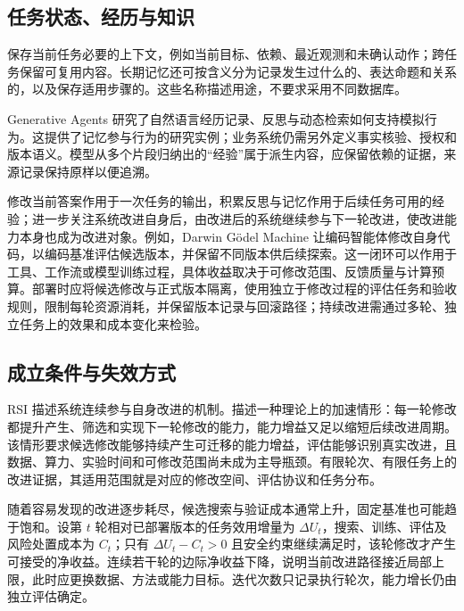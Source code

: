 \documentclass[../textbook.tex]{subfiles}
\begin{document}
\subsection{任务状态、经历与知识}
保存当前任务必要的上下文，例如当前目标、依赖、最近观测和未确认动作；跨任务保留可复用内容。长期记忆还可按含义分为记录发生过什么的、表达命题和关系的，以及保存适用步骤的。这些名称描述用途，不要求采用不同数据库。

Generative Agents 研究了自然语言经历记录、反思与动态检索如何支持模拟行为\cite{park2023generativeagents}。这提供了记忆参与行为的研究实例；业务系统仍需另外定义事实核验、授权和版本语义。模型从多个片段归纳出的“经验”属于派生内容，应保留依赖的证据，来源记录保持原样以便追溯。

修改当前答案作用于一次任务的输出，积累反思与记忆作用于后续任务可用的经验；进一步关注系统改进自身后，由改进后的系统继续参与下一轮改进，使改进能力本身也成为改进对象。例如，Darwin G\"odel Machine 让编码智能体修改自身代码，以编码基准评估候选版本，并保留不同版本供后续探索\cite{zhang2026darwingodel}。这一闭环可以作用于工具、工作流或模型训练过程，具体收益取决于可修改范围、反馈质量与计算预算。部署时应将候选修改与正式版本隔离，使用独立于修改过程的评估任务和验收规则，限制每轮资源消耗，并保留版本记录与回滚路径；持续改进需通过多轮、独立任务上的效果和成本变化来检验。

\subsection{成立条件与失效方式}
RSI 描述系统连续参与自身改进的机制。描述一种理论上的加速情形：每一轮修改都提升产生、筛选和实现下一轮修改的能力，能力增益又足以缩短后续改进周期。该情形要求候选修改能够持续产生可迁移的能力增益，评估能够识别真实改进，且数据、算力、实验时间和可修改范围尚未成为主导瓶颈。有限轮次、有限任务上的改进证据，其适用范围就是对应的修改空间、评估协议和任务分布。

随着容易发现的改进逐步耗尽，候选搜索与验证成本通常上升，固定基准也可能趋于饱和。设第 $t$ 轮相对已部署版本的任务效用增量为 $\Delta U_t$，搜索、训练、评估及风险处置成本为 $C_t$；只有 $\Delta U_t-C_t>0$ 且安全约束继续满足时，该轮修改才产生可接受的净收益。连续若干轮的边际净收益下降，说明当前改进路径接近局部上限，此时应更换数据、方法或能力目标。迭代次数只记录执行轮次，能力增长仍由独立评估确定。
\end{document}
